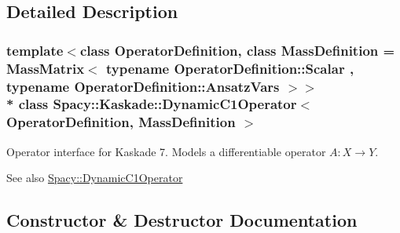 \subsection{Detailed Description}
\subsubsection*{template$<$class Operator\+Definition, class Mass\+Definition = Mass\+Matrix$<$ typename Operator\+Definition\+::\+Scalar , typename Operator\+Definition\+::\+Ansatz\+Vars $>$$>$\\*
class Spacy\+::\+Kaskade\+::\+Dynamic\+C1\+Operator$<$ Operator\+Definition, Mass\+Definition $>$}

Operator interface for Kaskade 7. Models a differentiable operator $A:X\rightarrow Y$. 

\begin{DoxySeeAlso}{See also}
\hyperlink{classSpacy_1_1DynamicC1Operator}{Spacy\+::\+Dynamic\+C1\+Operator} 
\end{DoxySeeAlso}


\subsection{Constructor \& Destructor Documentation}
